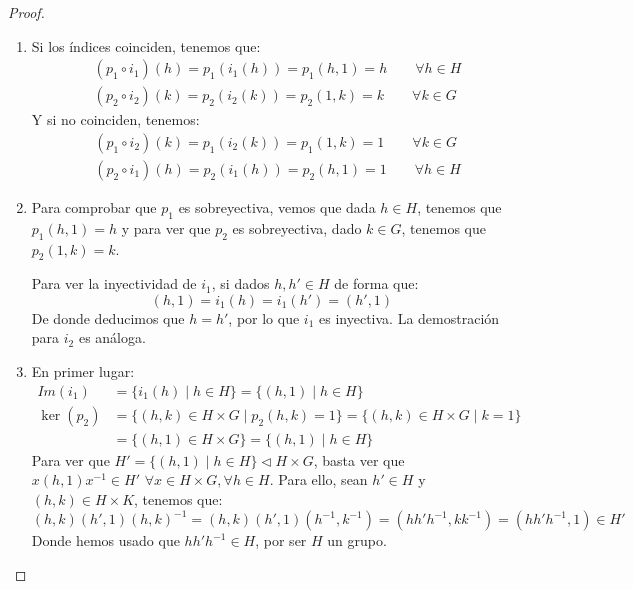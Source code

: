 \begin{prop}
\begin{proof}
\begin{enumerate}
\begin{itemize}
                \end{itemize}
            \item Si los índices coinciden, tenemos que:
                \begin{align*}
                    &(p_1\circ i_1)(h) = p_1(i_1(h)) = p_1(h,1) = h \qquad \forall h\in H \\
                    &(p_2\circ i_2)(k) = p_2(i_2(k)) = p_2(1,k) = k \qquad \forall k\in G 
                \end{align*}
                Y si no coinciden, tenemos:
                \begin{align*}
                    &(p_1\circ i_2)(k) = p_1(i_2(k)) = p_1(1,k) = 1 \qquad \forall k\in G \\
                    &(p_2\circ i_1)(h) = p_2(i_1(h)) = p_2(h,1) = 1 \qquad \forall h\in H
                \end{align*}
            \item Para comprobar que $p_1$ es sobreyectiva, vemos que dada $h\in H$, tenemos que $p_1(h,1) = h$ y para ver que $p_2$ es sobreyectiva, dado $k\in G$, tenemos que $p_2(1,k) = k$.

                Para ver la inyectividad de $i_1$, si dados $h,h'\in H$ de forma que:
                \begin{equation*}
                    (h,1) = i_1(h) = i_1(h') = (h',1)
                \end{equation*}
                De donde deducimos que $h=h'$, por lo que $i_1$ es inyectiva. La demostración para $i_2$ es análoga.
            \item En primer lugar:
                \begin{align*}
                    Im(i_1) &= \{i_1(h) \mid h\in H\} = \{(h,1) \mid h\in H\} \\
                    \ker(p_2) &= \{(h,k)\in H\times G \mid p_2(h,k)=1\} = \{(h,k)\in H\times G \mid k = 1\} \\ &= \{(h,1)\in H\times G\} = \{(h,1)\mid h\in H\}
                \end{align*}
                Para ver que $H' = \{(h,1)\mid h\in H\} \lhd H\times G$, basta ver que $x(h,1)x^{-1} \in H'$ $\forall x\in H\times G, \forall h\in H$. Para ello, sean $h'\in H$ y $(h,k)\in H\times K$, tenemos que:
                \begin{equation*}
                    (h,k)(h',1){(h,k)}^{-1} = (h,k)(h',1)\left(h^{-1},k^{-1}\right) = (hh'h^{-1},kk^{-1}) = (hh'h^{-1},1) \in H'
                \end{equation*}
                Donde hemos usado que $hh'h^{-1}\in H$, por ser $H$ un grupo.


\end{enumerate}
\end{proof}
\end{prop}

